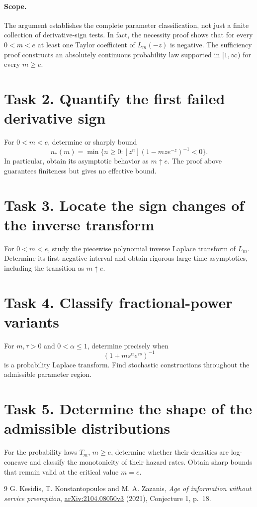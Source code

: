 \documentclass[11pt]{article}
\begin{document}
\paragraph{Scope.}
The argument establishes the complete parameter classification,
not just a finite collection of derivative-sign tests. In fact,
the necessity proof shows that for every $0<m<e$ at least one
Taylor coefficient of $L_m(-z)$ is negative. The sufficiency proof
constructs an absolutely continuous probability law supported in
$[1,\infty)$ for every $m\geq e$.

\section*{Task 2. Quantify the first failed derivative sign}
For $0<m<e$, determine or sharply bound
\[
 n_*(m)=\min\{n\geq0:[z^n](1-mze^{-z})^{-1}<0\}.
\]
In particular, obtain its asymptotic behavior as $m\uparrow e$.
The proof above guarantees finiteness but gives no effective bound.

\section*{Task 3. Locate the sign changes of the inverse transform}
For $0<m<e$, study the piecewise polynomial inverse Laplace transform
of $L_m$. Determine its first negative interval and obtain rigorous
large-time asymptotics, including the transition as $m\uparrow e$.

\section*{Task 4. Classify fractional-power variants}
For $m,\tau>0$ and $0<\alpha\leq1$, determine precisely when
\[
 (1+m s^\alpha e^{\tau s})^{-1}
\]
is a probability Laplace transform. Find stochastic constructions
throughout the admissible parameter region.

\section*{Task 5. Determine the shape of the admissible distributions}
For the probability laws $T_m$, $m\geq e$, determine whether their
densities are log-concave and classify the monotonicity of their hazard
rates. Obtain sharp bounds that remain valid at the critical value $m=e$.

\begin{thebibliography}{9}
G. Kesidis, T. Konstantopoulos and M. A. Zazanis,
\emph{Age of information without service preemption},
\href{https://arxiv.org/abs/2104.08050v3}{arXiv:2104.08050v3}
(2021), Conjecture 1, p.~18.
\end{thebibliography}
\end{document}
